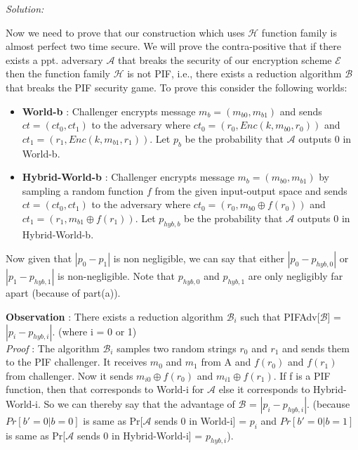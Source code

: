 \documentclass[a4paper, 11pt]{article}
\newenvironment{solution}
    {\textit{Solution:}}
    {\clearpage}
\newcommand{\calA}{\mathcal{A}}
\newcommand{\calB}{\mathcal{B}}
\newcommand{\calE}{\mathcal{E}}
\newcommand{\calH}{\mathcal{H}}
\begin{document}
\begin{solution}
\begin{enumerate}[(a)]
        Now we need to prove that our construction which uses $\calH$ function family is almost perfect two time secure. We will prove the contra-positive that if there exists a ppt. adversary $\calA$ that breaks the security of our encryption scheme $\calE$ then the function family $\calH$ is not PIF, i.e., there exists a reduction algorithm $\calB$ that breaks the PIF security game. To prove this consider the following worlds: 
        \begin{itemize}
            \item \textbf{World-b} : Challenger encrypts message $m_b = (m_{b0}, m_{b1})$ and sends $ct = (ct_0, ct_1)$ to the adversary where $ct_0 = (r_0, Enc(k, m_{b0}, r_0))$ and $ct_1 = (r_1, Enc(k, m_{b1}, r_1))$. Let $p_b$ be the probability that $\calA$ outputs 0 in World-b.
            \item \textbf{Hybrid-World-b} : Challenger encrypts message  $m_b = (m_{b0}, m_{b1})$ by sampling a random function $f$ from the given input-output space and sends $ct = (ct_0, ct_1)$ to the adversary where $ct_0 = (r_0, m_{b0} \oplus f(r_0))$ and $ct_1 = (r_1, m_{b1} \oplus f(r_1))$. Let $p_{hyb,b}$ be the probability that $\calA$ outputs 0 in Hybrid-World-b.
        \end{itemize}

        Now given that $|p_0 - p_1|$ is non negligible, we can say that either $|p_0 - p_{hyb,0}|$ or $|p_1 - p_{hyb,1}|$ is non-negligible. Note that $p_{hyb,0}$ and $ p_{hyb,1}$ are only negligibly far apart (because of part(a)).

        \textbf{Observation} : There exists a reduction algorithm $\calB_i$ such that PIFAdv[$\calB$] = $|p_i - p_{hyb,i}|$. (where i = 0 or 1) \\
        \textit{Proof} : The algorithm $\calB_i$ samples two random strings $r_0$ and $r_1$ and sends them to the PIF challenger. It receives $m_0$ and $m_1$ from A and $f(r_0)$ and $f(r_1)$ from challenger. Now it sends $m_{i0} \oplus f(r_0)$ and $m_{i1} \oplus f(r_1)$. If f is a PIF function, then that corresponds to World-i for $\calA$ else it corresponds to Hybrid-World-i. So we can thereby say that the advantage of $\calB$ = $|p_i - p_{hyb,i}|$. (because $Pr[b'=0|b=0]$ is same as Pr[$\calA$ sends 0 in World-i] = $p_i$ and $Pr[b'=0|b=1]$ is same as Pr[$\calA$ sends 0 in Hybrid-World-i] = $p_{hyb,i}$).
        
    \end{enumerate}
\end{solution}
\end{document}
